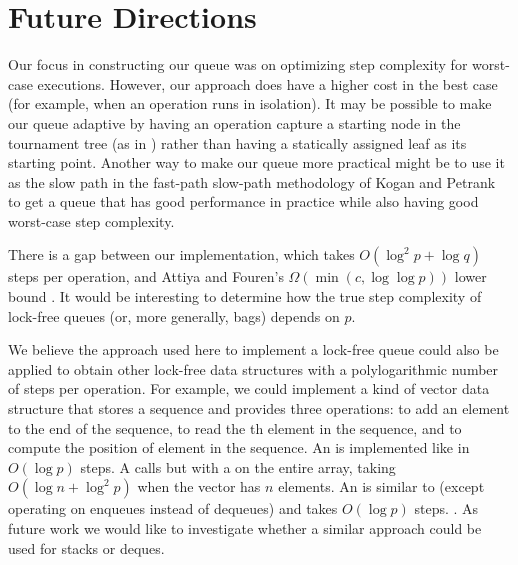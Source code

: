 
\section{Future Directions}

Our focus in constructing our queue was on optimizing step complexity for worst-case executions.
However, our approach does have a higher cost in the best case (for example, when an operation
runs in isolation).
It may be possible to make our queue adaptive by having an operation capture a starting node
in the tournament tree (as in \cite{??}) rather than having a statically assigned leaf as its starting point.
Another way to make our queue more practical might be to use it as the slow path in the
fast-path slow-path methodology of Kogan and Petrank \cite{10.1145/2370036.2145835} to
get a queue that has good performance in practice while also having good worst-case step complexity.

There is a gap between our implementation, which takes $O(\log^2 p + \log q)$ steps per operation,
and Attiya and Fouren's $\Omega(\min(c,\log\log p))$ lower bound \cite{DBLP:conf/opodis/AttiyaF17}.
It would be interesting to determine how the true step complexity of lock-free queues (or, more generally, bags)
depends on $p$.

We believe the approach used here to implement a lock-free queue 
could also be applied to obtain other lock-free
data structures with a polylogarithmic number of steps per operation.
For example, we could implement a kind of vector data structure that stores a sequence and
provides three operations:  to add an element  to the end of the sequence,
 to read the th element in the sequence, and
 to compute the position of element  in the sequence.
An  is implemented like  in $O(\log p)$ steps.  
A  calls  but with a  on the entire  array, taking $O(\log n + \log^2p)$ when the vector has $n$ elements.  
An  is similar to  (except operating on enqueues instead of dequeues) and takes $O(\log p)$ steps.
.
As future work we would like to investigate whether a similar approach could be used for stacks or deques.

